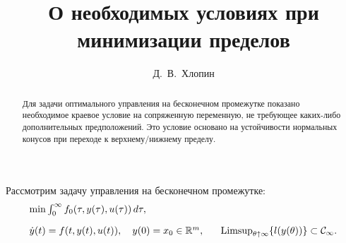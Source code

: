 \usepackage{todonotes} %

\usepackage[russian]{nla}



\fi

\title{О необходимых условиях при минимизации пределов %
}
\author{Д.~В.~Хлопин
} %

\maketitle

\begin{abstract}
	   Для задачи оптимального управления на бесконечном промежутке  показано необходимое краевое условие на сопряженную переменную, не требующее каких-либо дополнительных предположений. Это условие основано на устойчивости  нормальных конусов при переходе к верхнему/нижнему пределу. 
	   
\end{abstract}



	Рассмотрим задачу управления на бесконечном промежутке:
$$
\begin{array}{l}
	\min \int_{0}^\infty f_0(\tau,y(\tau),u(\tau))\, d\tau,\\[1em]
\dot{y}(t)=f(t,y(t),u(t)),  \quad y(0)=x_0\in\mathbb{R}^m
,\quad
\ \mathop{\hbox{ \rm{Limsup}}}_{\theta\uparrow\infty} \{l(y(\theta))\}\subset \mathcal{C}_\infty.
\end{array}
$$

